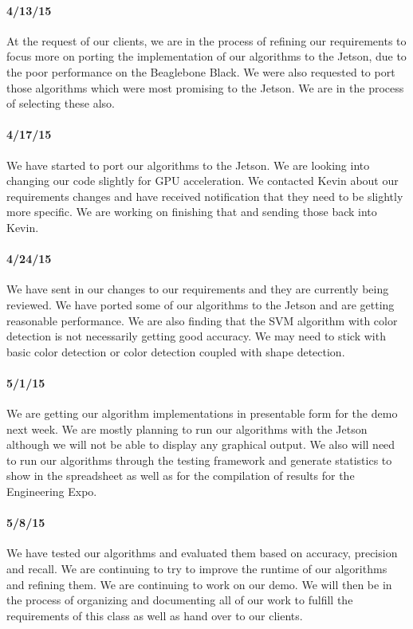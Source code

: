 \documentclass[letterpaper,10pt,titlepage]{article}
\begin{document}
    \paragraph*{4/13/15}
    At the request of our clients, we are in the process of refining our 
    requirements to focus more on porting the implementation of our algorithms
    to the Jetson, due to the poor performance on the Beaglebone Black. We 
    were also requested to port those algorithms which were most promising to 
    the Jetson. We are in the process of selecting these also. 
    \paragraph*{4/17/15}
    We have started to port our algorithms to the Jetson. We are looking into 
    changing our code slightly for GPU acceleration. We contacted Kevin about
    our requirements changes and have received notification that they need
    to be slightly more specific. We are working on finishing that and sending
    those back into Kevin.
    \paragraph*{4/24/15}
    We have sent in our changes to our requirements and they are currently 
    being reviewed. We have ported some of our algorithms to the Jetson and are
    getting reasonable performance. We are also finding that the SVM algorithm
    with color detection is not necessarily getting good accuracy. We may need
    to stick with basic color detection or color detection coupled with shape
    detection. 
    \paragraph*{5/1/15}
    We are getting our algorithm implementations in presentable form for the 
    demo next week. We are mostly planning to run our algorithms with the 
    Jetson although we will not be able to display any graphical output. We 
    also will need to run our algorithms through the testing framework and 
    generate statistics to show in the spreadsheet as well as for the 
    compilation of results for the Engineering Expo.
    \paragraph*{5/8/15}
    We have tested our algorithms and evaluated them based on accuracy, 
    precision and recall. We are continuing to try to improve the runtime of
    our algorithms and refining them. We are continuing to work on our demo.
    We will then be in the process of organizing and documenting all of our 
    work to fulfill the requirements of this class as well as hand over to our
    clients. 
\end{document}
